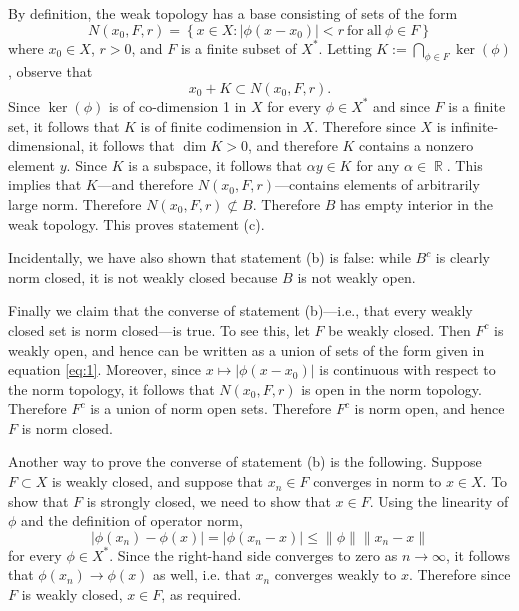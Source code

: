 \documentclass[answers]{exam}
\DeclareMathOperator{\RR}{\mathbb{R}}
\begin{document}
\begin{questions}
\begin{solution}
      By definition, the weak topology has a base consisting of sets of the form
    \begin{equation}\label{eq:1}
      N(x_{0},F,r)=\left\{ x\in X : |\phi(x-x_{0})|<r \mathrm{\ for\ all\ }\phi\in F\right\}
    \end{equation}
    where $x_{0}\in X$, $r>0$, and $F$ is a finite subset of $X^{*}$. Letting $K:= \bigcap_{\phi \in F} \ker(\phi)$, observe that
    \begin{equation*}
      x_{0}+ K \subset N(x_{0},F,r).
    \end{equation*}
    Since $\ker(\phi)$ is of co-dimension 1 in $X$ for every $\phi\in X^{*}$ and since $F$ is a finite set, it follows that $K$ is of finite codimension in $X$. Therefore since $X$ is infinite-dimensional, it follows that $\dim K >0$, and therefore $K$ contains a nonzero element $y$. Since $K$ is a subspace, it follows that $\alpha y\in K$ for any $\alpha\in \RR$. This implies that $K$---and therefore $N(x_{0},F,r)$---contains elements of arbitrarily large norm. Therefore $N(x_{0},F,r)\not\subset B$. Therefore $B$ has empty interior in the weak topology. This proves statement (c).

    Incidentally, we have also shown that statement (b) is false: while $B^c$ is clearly norm closed, it is not weakly closed because $B$ is not weakly open.

    Finally we claim that the converse of statement (b)---i.e., that every weakly closed set is norm closed---is true. To see this, let $F$ be weakly closed. Then $F^c$ is weakly open, and hence can be written as a union of sets of the form given in equation \eqref{eq:1}. Moreover, since $x\mapsto |\phi(x-x_{0})|$ is continuous with respect to the norm topology, it follows that $N(x_{0},F,r)$ is open in the norm topology. Therefore $F^c$ is a union of norm open sets. Therefore $F^c$ is norm open, and hence $F$ is norm closed.

    Another way to prove the converse of statement (b) is the following. Suppose $F\subset X$ is weakly closed, and suppose that $x_{n}\in F$ converges in norm to $x\in X$. To show that $F$ is strongly closed, we need to show that $x\in F$. Using the linearity of $\phi$ and the definition of operator norm,
    \begin{equation*}
      |\phi(x_{n})-\phi(x)| = |\phi(x_{n}-x)|\leq \| \phi \| \| x_{n}-x \|
    \end{equation*}
    for every $\phi\in X^{*}$. Since the right-hand side converges to zero as $n\to\infty$, it follows that $\phi(x_{n})\to \phi(x)$ as well, i.e. that $x_{n}$ converges weakly to $x$. Therefore since $F$ is weakly closed, $x\in F$, as required.
\end{solution}



\end{questions}
\end{document}
